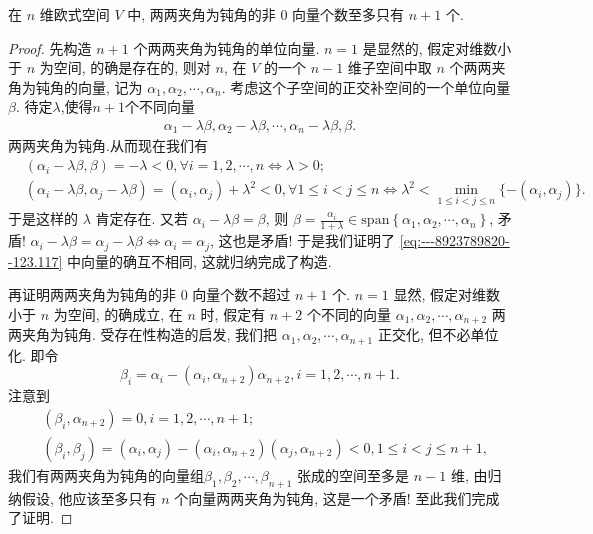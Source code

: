 \documentclass[../../main.tex]{subfiles}
\begin{document}
\begin{example}
在 \( n \) 维欧式空间 \( V \) 中, 两两夹角为钝角的非 0 向量个数至多只有 \( n+1 \) 个.
\end{example}
\begin{proof}
先构造 \( n+1 \) 个两两夹角为钝角的单位向量. \( n=1 \) 是显然的, 假定对维数小于 \( n \) 为空间, 的确是存在的, 则对 \( n \), 在 \( V \) 的一个 \( n-1 \) 维子空间中取 \( n \) 个两两夹角为钝角的向量, 记为 \( \alpha_1, \alpha_2, \cdots, \alpha_n \). 考虑这个子空间的正交补空间的一个单位向量 \( \beta \). 待定$\lambda$,使得$n+1$个不同向量
\begin{align}
\alpha_1 - \lambda\beta, \alpha_2 - \lambda\beta, \cdots, \alpha_n - \lambda\beta, \beta. \label{eq:---8923789820--123.117}
\end{align}
两两夹角为钝角.从而现在我们有
\[
\begin{aligned}
&(\alpha_i - \lambda\beta, \beta) = -\lambda < 0, \forall i = 1, 2, \cdots, n \Leftrightarrow \lambda > 0; \\
&(\alpha_i - \lambda\beta, \alpha_j - \lambda\beta) = (\alpha_i, \alpha_j) + \lambda^2 < 0, \forall 1 \leqslant i < j \leqslant n \Leftrightarrow \lambda^2 < \min_{1 \leqslant i < j \leqslant n} \{ -(\alpha_i, \alpha_j) \}.
\end{aligned}
\]
于是这样的 \( \lambda \) 肯定存在. 又若 \( \alpha_i - \lambda\beta = \beta \), 则 \( \beta = \frac{\alpha_i}{1+\lambda} \in \mathrm{span}\left\{ \alpha _1,\alpha _2,\cdots ,\alpha _n \right\} \), 矛盾! \( \alpha_i - \lambda\beta = \alpha_j - \lambda\beta \Leftrightarrow \alpha_i = \alpha_j \), 这也是矛盾! 于是我们证明了 \eqref{eq:---8923789820--123.117} 中向量的确互不相同, 这就归纳完成了构造.

再证明两两夹角为钝角的非 0 向量个数不超过 \( n+1 \) 个. \( n=1 \) 显然, 假定对维数小于 \( n \) 为空间, 的确成立, 在 \( n \) 时, 假定有 \( n+2 \) 个不同的向量 \( \alpha_1, \alpha_2, \cdots, \alpha_{n+2} \) 两两夹角为钝角. 受存在性构造的启发, 我们把 \( \alpha_1, \alpha_2, \cdots, \alpha_{n+1} \) 正交化, 但不必单位化. 即令
\[
\beta_i = \alpha_i - (\alpha_i, \alpha_{n+2}) \alpha_{n+2}, i = 1, 2, \cdots, n+1.
\]
注意到
\[
\begin{aligned}
&(\beta_i, \alpha_{n+2}) = 0, i = 1, 2, \cdots, n+1; \\
&(\beta_i, \beta_j) = (\alpha_i, \alpha_j) - (\alpha_i, \alpha_{n+2})(\alpha_j, \alpha_{n+2}) < 0, 1 \leqslant i < j \leqslant n+1,
\end{aligned}
\]
我们有两两夹角为钝角的向量组\( \beta_1, \beta_2, \cdots, \beta_{n+1} \) 张成的空间至多是 \( n-1 \) 维, 由归纳假设, 他应该至多只有 \( n \) 个向量两两夹角为钝角, 这是一个矛盾! 至此我们完成了证明.
\end{proof}
\end{document}
